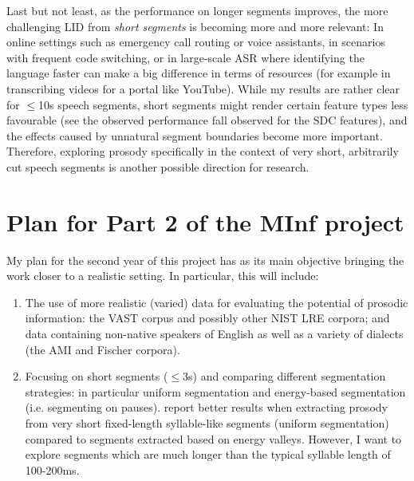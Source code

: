 \documentclass[bsc,frontabs,twoside,singlespacing,parskip,deptreport]{infthesis}
\begin{document}
{{    Last but not least, as the performance on longer segments improves, the more challenging LID from \textit{short segments} is becoming more and more relevant: In online settings such as emergency call routing or voice assistants, in scenarios with frequent code switching, or in large-scale ASR where identifying the language faster can make a big difference in terms of resources (for example in transcribing videos for a portal like YouTube).
    While my results are rather clear for $\leq$10s speech segments, short segments might render certain feature types less favourable (see the observed performance fall observed for the SDC features), and the effects caused by unnatural segment boundaries become more important.
    Therefore, exploring prosody specifically in the context of very short, arbitrarily cut speech segments is another possible direction for research.
  }

  \section{Plan for Part 2 of the MInf project}{
    \label{sec:future-plan}
    My plan for the second year of this project has as its main objective bringing the work closer to a realistic setting. In particular, this will include:
    \begin{enumerate}
      \item {The use of more realistic (varied) data for evaluating the potential of prosodic information: the VAST corpus and possibly other NIST LRE corpora; and data containing non-native speakers of English as well as a variety of dialects (the AMI \citep{Mccowan_et_al_2005} and Fischer \citep{Cieri_at_al_2004} corpora).}
      \item {Focusing on short segments ($\leq$3s) and comparing different segmentation strategies: in particular uniform segmentation and energy-based segmentation (i.e. segmenting on pauses). \citet{Martinez_et_al_2013} report better results when extracting prosody from very short fixed-length syllable-like segments (uniform segmentation) compared to segments extracted based on energy valleys. However, I want to explore segments which are much longer than the typical syllable length of 100-200ms.}
    \end{enumerate}
  }
}
\end{document}
